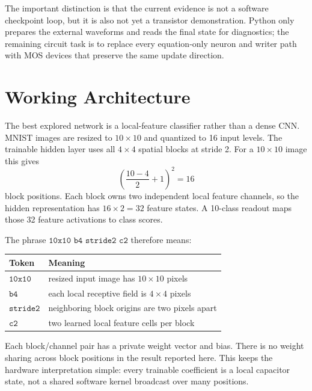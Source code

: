 \documentclass[11pt]{article}
\newcommand{\code}[1]{\texttt{#1}}
\begin{document}
The important distinction is that the current evidence is not a software
checkpoint loop, but it is also not yet a transistor demonstration.  Python only
prepares the external waveforms and reads the final state for diagnostics; the
remaining circuit task is to replace every equation-only neuron and writer path
with MOS devices that preserve the same update direction.

\section{Working Architecture}

The best explored network is a local-feature classifier rather than a dense CNN.
MNIST images are resized to \(10\times 10\) and quantized to 16 input levels.
The trainable hidden layer uses all \(4\times4\) spatial blocks at stride 2.
For a \(10\times10\) image this gives
\[
  \left(\frac{10-4}{2}+1\right)^2 = 16
\]
block positions.  Each block owns two independent local feature channels, so
the hidden representation has \(16\times2=32\) feature states.  A 10-class
readout maps those 32 feature activations to class scores.

The phrase \(\code{10x10 b4 stride2 c2}\) therefore means:
\begin{center}
  \begin{tabular}{ll}
    \toprule
    Token & Meaning \\
    \midrule
    \(\code{10x10}\) & resized input image has \(10\times10\) pixels \\
    \(\code{b4}\) & each local receptive field is \(4\times4\) pixels \\
    \(\code{stride2}\) & neighboring block origins are two pixels apart \\
    \(\code{c2}\) & two learned local feature cells per block \\
    \bottomrule
  \end{tabular}
\end{center}

Each block/channel pair has a private weight vector and bias.  There is no
weight sharing across block positions in the result reported here.  This keeps
the hardware interpretation simple: every trainable coefficient is a local
capacitor state, not a shared software kernel broadcast over many positions.
\end{document}
